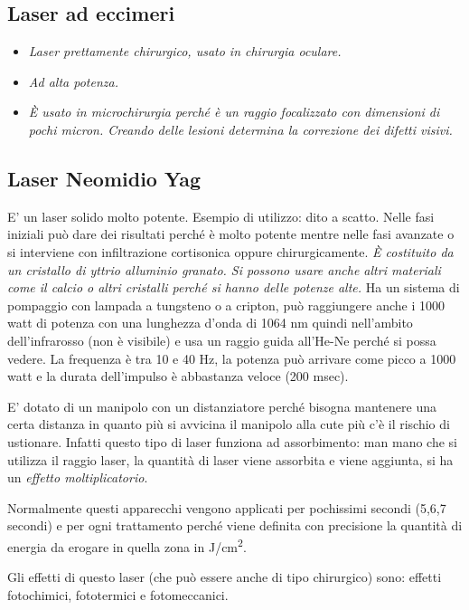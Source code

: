 \subsection{Laser ad eccimeri}

\begin{itemize}
\item
  \emph{Laser prettamente chirurgico, usato in chirurgia oculare. }
\item
  \emph{Ad alta potenza. }
\item
  \emph{È usato in microchirurgia perché è un raggio focalizzato con
  dimensioni di pochi micron. Creando delle lesioni determina la
  correzione dei difetti visivi.}
\end{itemize}

\subsection{Laser Neomidio Yag}

E' un laser solido molto potente. Esempio di utilizzo: dito a scatto.
Nelle fasi iniziali può dare dei risultati perché è molto potente mentre
nelle fasi avanzate o si interviene con infiltrazione cortisonica oppure
chirurgicamente. \emph{È costituito da un cristallo di yttrio alluminio
granato. Si possono usare anche altri materiali come il calcio o altri
cristalli perché si hanno delle potenze alte.} Ha un sistema di
pompaggio con lampada a tungsteno o a cripton, può raggiungere anche i
1000 watt di potenza con una lunghezza d'onda di 1064 nm quindi
nell'ambito dell'infrarosso (non è visibile) e usa un raggio guida
all'He-Ne perché si possa vedere. La frequenza è tra 10 e 40 Hz, la
potenza può arrivare come picco a 1000 watt e la durata dell'impulso è
abbastanza veloce (200 msec).

E' dotato di un manipolo con un distanziatore perché bisogna mantenere
una certa distanza in quanto più si avvicina il manipolo alla cute più
c'è il rischio di ustionare. Infatti questo tipo di laser funziona ad
assorbimento: man mano che si utilizza il raggio laser, la quantità di
laser viene assorbita e viene aggiunta, si ha un \emph{effetto
moltiplicatorio}.

Normalmente questi apparecchi vengono applicati per pochissimi secondi
(5,6,7 secondi) e per ogni trattamento perché viene definita con
precisione la quantità di energia da erogare in quella zona in J/cm\textsuperscript{2}.

Gli effetti di questo laser (che può essere anche di tipo chirurgico)
sono: effetti fotochimici, fototermici e fotomeccanici.

